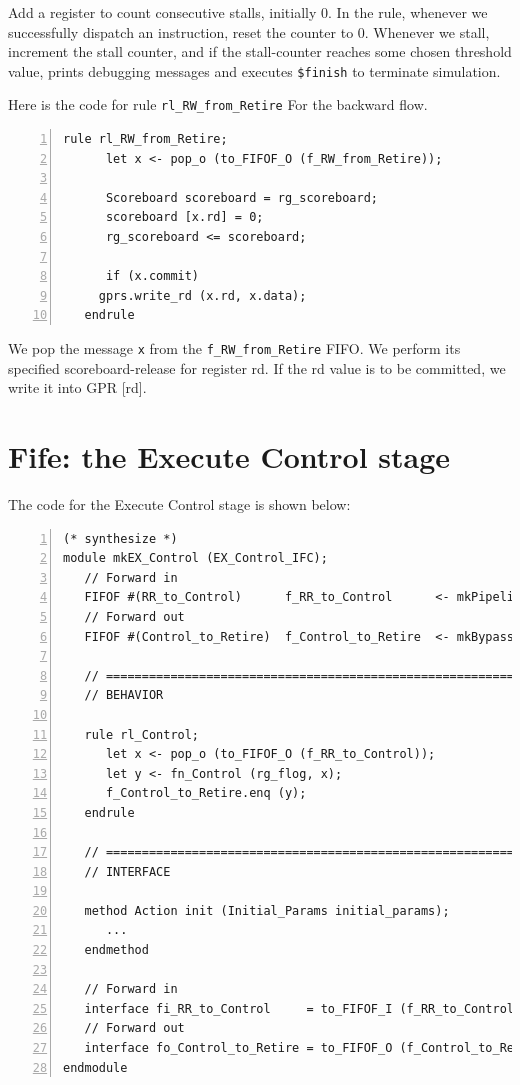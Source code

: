 Add a register to count consecutive stalls, initially 0.  In the rule,
whenever we successfully dispatch an instruction, reset the counter to
0.  Whenever we stall, increment the stall counter, and if the
stall-counter reaches some chosen threshold value, prints debugging
messages and executes \verb|$finish| to terminate simulation.

\Endexercise

Here is the code for rule \verb|rl_RW_from_Retire| For the backward
flow.

{\small
\begin{Verbatim}[frame=single, numbers=left, label=(In file:src\_Fife/S3\_RR\_RW.bsv)]
   rule rl_RW_from_Retire;
      let x <- pop_o (to_FIFOF_O (f_RW_from_Retire));

      Scoreboard scoreboard = rg_scoreboard;
      scoreboard [x.rd] = 0;
      rg_scoreboard <= scoreboard;

      if (x.commit)
	 gprs.write_rd (x.rd, x.data);
   endrule
\end{Verbatim}
}

We pop the message \verb|x| from the \verb|f_RW_from_Retire| FIFO.  We
perform its specified scoreboard-release for register rd.  If the rd
value is to be committed, we write it into GPR [rd].


\section{Fife: the Execute Control stage}

\label{Sec_Fife_Control_stage}

The code for the Execute Control stage is shown below:

{\small
\begin{Verbatim}[frame=single, numbers=left, label=(In file:src\_Fife/S4\_EX\_Control.bsv)]
(* synthesize *)
module mkEX_Control (EX_Control_IFC);
   // Forward in
   FIFOF #(RR_to_Control)      f_RR_to_Control      <- mkPipelineFIFOF;
   // Forward out
   FIFOF #(Control_to_Retire)  f_Control_to_Retire  <- mkBypassFIFOF;

   // ================================================================
   // BEHAVIOR

   rule rl_Control;
      let x <- pop_o (to_FIFOF_O (f_RR_to_Control));
      let y <- fn_Control (rg_flog, x);
      f_Control_to_Retire.enq (y);
   endrule

   // ================================================================
   // INTERFACE

   method Action init (Initial_Params initial_params);
      ...
   endmethod

   // Forward in
   interface fi_RR_to_Control     = to_FIFOF_I (f_RR_to_Control);
   // Forward out
   interface fo_Control_to_Retire = to_FIFOF_O (f_Control_to_Retire);
endmodule
\end{Verbatim}
}

